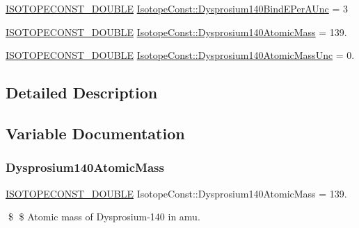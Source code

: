 \begin{DoxyCompactItemize}
\mbox{\hyperlink{group___isotope_const-_macros_ga8f45a7272ce02c0b4c65c44636ed719a}{I\+S\+O\+T\+O\+P\+E\+C\+O\+N\+S\+T\+\_\+\+D\+O\+U\+B\+LE}} \mbox{\hyperlink{group___isotope_const-_dysprosium-_dy140_gae89aa0211032d0bbdf8a2d2ca20dfd79}{Isotope\+Const\+::\+Dysprosium140\+Bind\+E\+Per\+A\+Unc}} = 3
\item 
\mbox{\hyperlink{group___isotope_const-_macros_ga8f45a7272ce02c0b4c65c44636ed719a}{I\+S\+O\+T\+O\+P\+E\+C\+O\+N\+S\+T\+\_\+\+D\+O\+U\+B\+LE}} \mbox{\hyperlink{group___isotope_const-_dysprosium-_dy140_ga8486bf74ca3ffc48b739ae6ab06dd11e}{Isotope\+Const\+::\+Dysprosium140\+Atomic\+Mass}} = 139.
\item 
\mbox{\hyperlink{group___isotope_const-_macros_ga8f45a7272ce02c0b4c65c44636ed719a}{I\+S\+O\+T\+O\+P\+E\+C\+O\+N\+S\+T\+\_\+\+D\+O\+U\+B\+LE}} \mbox{\hyperlink{group___isotope_const-_dysprosium-_dy140_gaacca8e226b727e9bbb88f85deb564b85}{Isotope\+Const\+::\+Dysprosium140\+Atomic\+Mass\+Unc}} = 0.
\end{DoxyCompactItemize}


\subsection{Detailed Description}


\subsection{Variable Documentation}
\mbox{\label{group___isotope_const-_dysprosium-_dy140_ga8486bf74ca3ffc48b739ae6ab06dd11e}} 
\subsubsection{\texorpdfstring{Dysprosium140\+Atomic\+Mass}{Dysprosium140AtomicMass}}
{\footnotesize\ttfamily \mbox{\hyperlink{group___isotope_const-_macros_ga8f45a7272ce02c0b4c65c44636ed719a}{I\+S\+O\+T\+O\+P\+E\+C\+O\+N\+S\+T\+\_\+\+D\+O\+U\+B\+LE}} Isotope\+Const\+::\+Dysprosium140\+Atomic\+Mass = 139.}

\$ \$ Atomic mass of Dysprosium-\/140 in amu. \mbox{\label{group___isotope_const-_dysprosium-_dy140_gaacca8e226b727e9bbb88f85deb564b85}} 
